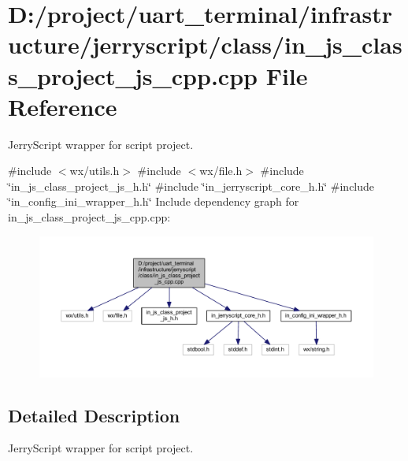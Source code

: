 \section{D\+:/project/uart\+\_\+terminal/infrastructure/jerryscript/class/in\+\_\+js\+\_\+class\+\_\+project\+\_\+js\+\_\+cpp.cpp File Reference}
\label{in__js__class__project__js__cpp_8cpp}


Jerry\+Script wrapper for script project.  


{\ttfamily \#include $<$wx/utils.\+h$>$}\newline
{\ttfamily \#include $<$wx/file.\+h$>$}\newline
{\ttfamily \#include \char`\"{}in\+\_\+js\+\_\+class\+\_\+project\+\_\+js\+\_\+h.\+h\char`\"{}}\newline
{\ttfamily \#include \char`\"{}in\+\_\+jerryscript\+\_\+core\+\_\+h.\+h\char`\"{}}\newline
{\ttfamily \#include \char`\"{}in\+\_\+config\+\_\+ini\+\_\+wrapper\+\_\+h.\+h\char`\"{}}\newline
Include dependency graph for in\+\_\+js\+\_\+class\+\_\+project\+\_\+js\+\_\+cpp.\+cpp\+:
\nopagebreak
\begin{figure}[H]
\begin{center}
\leavevmode
\includegraphics[width=350pt]{in__js__class__project__js__cpp_8cpp__incl}
\end{center}
\end{figure}


\subsection{Detailed Description}
Jerry\+Script wrapper for script project. 

